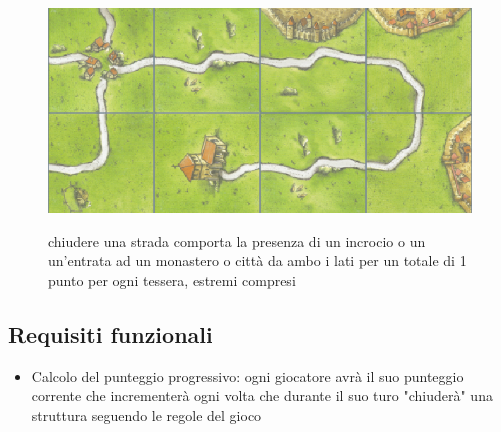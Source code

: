 \begin{figure}[]
    {\includegraphics[]{images/Strada.png}}

    \caption{chiudere una strada comporta la presenza di un incrocio o un un’entrata ad un monastero o città da ambo i lati per un totale di 1 punto per ogni tessera, estremi compresi}
\end{figure}

\subsection*{Requisiti funzionali}

\begin{itemize}
\item Calcolo del punteggio progressivo: ogni giocatore avrà il suo punteggio corrente che incrementerà ogni volta che durante il suo turo "chiuderà" una struttura seguendo le regole del gioco
\end{itemize}

